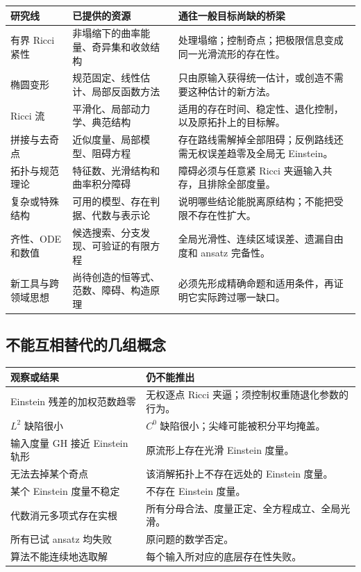 \documentclass[11pt,a4paper]{article}
\theoremstyle{definition}
\begin{document}
\begin{longtable}{P{0.18\textwidth}P{0.33\textwidth}P{0.40\textwidth}}
\toprule
研究线 & 已提供的资源 & 通往一般目标尚缺的桥梁\\\midrule\endhead
有界 Ricci 紧性 & 非塌缩下的曲率能量、奇异集和收敛结构 & 处理塌缩；控制奇点；把极限信息变成同一光滑流形的存在性。\\
椭圆变形 & 规范固定、线性估计、局部反函数方法 & 只由原输入获得统一估计，或创造不需要这种估计的新方法。\\
Ricci 流 & 平滑化、局部动力学、典范结构 & 适用的存在时间、稳定性、退化控制，以及原拓扑上的目标解。\\
拼接与去奇点 & 近似度量、局部模型、阻碍方程 & 存在路线需解掉全部阻碍；反例路线还需无权误差趋零及全局无 Einstein。\\
拓扑与规范理论 & 特征数、光滑结构和曲率积分障碍 & 障碍必须与任意紧 Ricci 夹逼输入共存，且排除全部度量。\\
复杂或特殊结构 & 可用的模型、存在判据、代数与表示论 & 说明哪些结论能脱离原结构；不能把受限不存在性扩大。\\
齐性、ODE和数值 & 候选搜索、分支发现、可验证的有限方程 & 全局光滑性、连续区域误差、遗漏自由度和 ansatz 完备性。\\
新工具与跨领域思想 & 尚待创造的恒等式、范数、障碍、构造原理 & 必须先形成精确命题和适用条件，再证明它实际跨过哪一缺口。\\\bottomrule
\end{longtable}

\subsection{不能互相替代的几组概念}

\begin{longtable}{P{0.36\textwidth}P{0.57\textwidth}}
\toprule
观察或结果 & 仍不能推出\\\midrule
Einstein 残差的加权范数趋零 & 无权逐点 Ricci 夹逼；须控制权重随退化参数的行为。\\
$L^2$ 缺陷很小 & $C^0$ 缺陷很小；尖峰可能被积分平均掩盖。\\
输入度量 GH 接近 Einstein 轨形 & 原流形上存在光滑 Einstein 度量。\\
无法去掉某个奇点 & 该消解拓扑上不存在远处的 Einstein 度量。\\
某个 Einstein 度量不稳定 & 不存在 Einstein 度量。\\
代数消元多项式存在实根 & 所有分母合法、度量正定、全方程成立、全局光滑。\\
所有已试 ansatz 均失败 & 原问题的数学否定。\\
算法不能连续地选取解 & 每个输入所对应的底层存在性失败。\\\bottomrule
\end{longtable}
\end{document}
